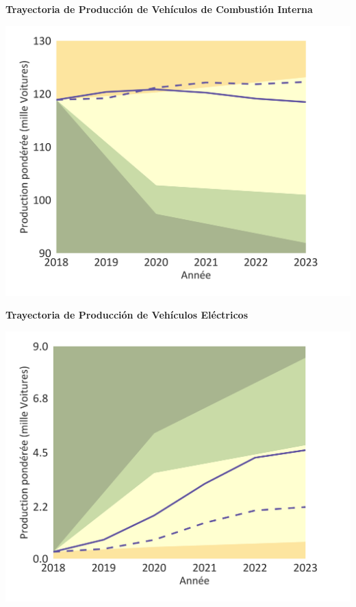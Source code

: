 \documentclass[10pt,table]{article}\usepackage[]{graphicx}\usepackage[]{color}
\begin{document}
	
	\begin{minipage}[t]{.49\linewidth}
		\textbf{Trayectoria de Producción de Vehículos de Combustión Interna}
		
		\includegraphics[trim = {0 0cm 0 0},width=1\linewidth]{ReportOutputs/Fig14}
		
	\end{minipage}	
	\hspace{.02\linewidth}
	\begin{minipage}[t]{.49\textwidth}
		\textbf{Trayectoria de Producción de Vehículos Eléctricos}
		
		\includegraphics[trim = {0 0cm 0 0},width=1\linewidth]{ReportOutputs/Fig15}
		
	\end{minipage}	
\end{document}
